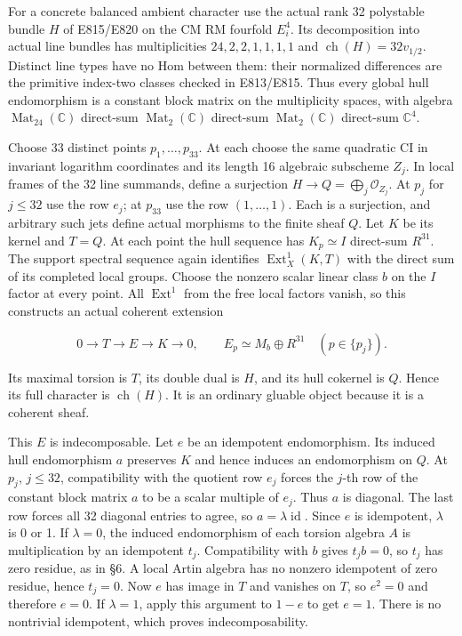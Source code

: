 For a concrete balanced ambient character use the actual rank 32
polystable bundle \(H\) of E815/E820 on the CM RM fourfold \(E_i^4\).
Its decomposition into actual line bundles has multiplicities
\(24,2,2,1,1,1,1\) and \(\operatorname{ch}(H)=32v_{1/2}\). Distinct line types have no
Hom between them: their normalized differences are the primitive
index-two classes checked in E813/E815. Thus every global hull
endomorphism is a constant block matrix on the multiplicity
spaces, with algebra \(\operatorname{Mat}_{24}(\mathbb C)\) direct-sum \(\operatorname{Mat}_2(\mathbb C)\) direct-sum
\(\operatorname{Mat}_2(\mathbb C)\) direct-sum \(\mathbb C^4\).

Choose 33 distinct points \(p_1,\ldots,p_{33}\). At each choose the same
quadratic CI in invariant logarithm coordinates and its length 16
algebraic subscheme \(Z_j\). In local frames of the 32 line summands,
define a surjection \(H\to Q=\bigoplus_j\mathcal O_{Z_j}\). At \(p_j\) for \(j\le32\)
use the row \(e_j\); at \(p_{33}\) use the row \((1,\ldots,1)\). Each is a surjection,
and arbitrary such jets define actual morphisms to the finite
sheaf \(Q\). Let \(K\) be its kernel and \(T=Q\). At each point the hull
sequence has \(K_p\simeq I\) direct-sum \(R^{31}\). The support spectral sequence
again identifies \(\operatorname{Ext}^1_X(K,T)\) with the direct sum of its completed
local groups. Choose the nonzero scalar linear class \(b\) on the
\(I\) factor at every point. All \(\operatorname{Ext}^1\) from the free local factors
vanish, so this constructs an actual coherent extension

\[
 0\longrightarrow T\longrightarrow E\longrightarrow K
       \longrightarrow0,
 \qquad E_p\simeq M_b\oplus R^{31}\quad(p\in\{p_j\}).
 \tag{HK.19}
\]

Its maximal torsion is \(T\), its double dual is \(H\), and its hull
cokernel is \(Q\). Hence its full character is \(\operatorname{ch}(H)\). It is an
ordinary gluable object because it is a coherent sheaf.

This \(E\) is indecomposable. Let \(e\) be an idempotent endomorphism.
Its induced hull endomorphism \(a\) preserves \(K\) and hence induces
an endomorphism on \(Q\). At \(p_j\), \(j\le32\), compatibility with the
quotient row \(e_j\) forces the \(j\)-th row of the constant block
matrix \(a\) to be a scalar multiple of \(e_j\). Thus \(a\) is diagonal.
The last row forces all 32 diagonal entries to agree, so
\(a=\lambda\operatorname{id}\). Since \(e\) is idempotent, \(\lambda\) is 0 or 1.
If \(\lambda=0\), the induced endomorphism of each torsion algebra \(A\)
is multiplication by an idempotent \(t_j\). Compatibility with \(b\)
gives \(t_jb=0\), so \(t_j\) has zero residue, as in §6. A local Artin
algebra has no nonzero idempotent of zero residue, hence \(t_j=0\).
Now \(e\) has image in \(T\) and vanishes on \(T\), so \(e^2=0\) and therefore \(e=0\).
If \(\lambda=1\), apply this argument to \(1-e\) to get \(e=1\). There is no
nontrivial idempotent, which proves indecomposability.

